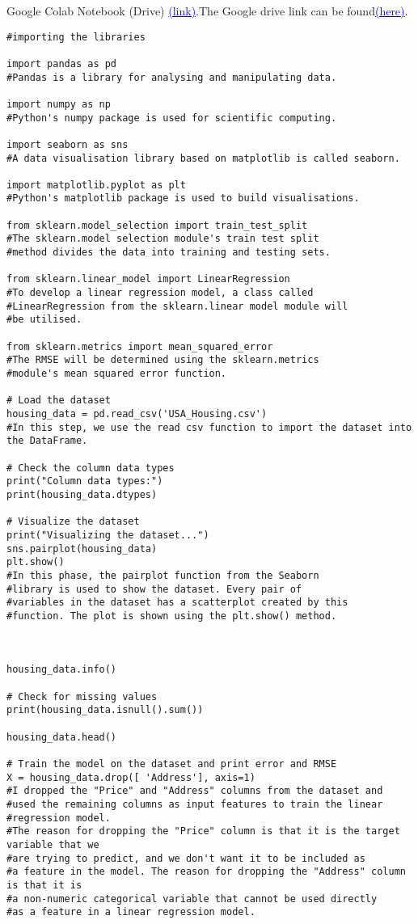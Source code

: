 \documentclass{article}
\begin{document}
Google Colab Notebook (Drive) \href{https://drive.google.com/drive/folders/1SFkQtmzvhyU-O0_g99m80oqBAWkEj22J?usp=sharing}{\textcolor{blue}{(link)}}.The Google drive link can be found\href{https://drive.google.com/drive/folders/1oUOGVvu0X8MpYs0S50cgQ-SZPvm9ikcR?usp=sharing}{\textcolor{blue}{(here)}}.
\begin{verbatim}
#importing the libraries

import pandas as pd
#Pandas is a library for analysing and manipulating data.

import numpy as np
#Python's numpy package is used for scientific computing.

import seaborn as sns
#A data visualisation library based on matplotlib is called seaborn.

import matplotlib.pyplot as plt
#Python's matplotlib package is used to build visualisations.

from sklearn.model_selection import train_test_split
#The sklearn.model selection module's train test split
#method divides the data into training and testing sets.

from sklearn.linear_model import LinearRegression
#To develop a linear regression model, a class called
#LinearRegression from the sklearn.linear model module will
#be utilised.

from sklearn.metrics import mean_squared_error
#The RMSE will be determined using the sklearn.metrics
#module's mean squared error function.

# Load the dataset
housing_data = pd.read_csv('USA_Housing.csv')
#In this step, we use the read csv function to import the dataset into the DataFrame.

# Check the column data types
print("Column data types:")
print(housing_data.dtypes)

# Visualize the dataset
print("Visualizing the dataset...")
sns.pairplot(housing_data)
plt.show()
#In this phase, the pairplot function from the Seaborn
#library is used to show the dataset. Every pair of
#variables in the dataset has a scatterplot created by this
#function. The plot is shown using the plt.show() method.



housing_data.info()

# Check for missing values
print(housing_data.isnull().sum())

housing_data.head()

# Train the model on the dataset and print error and RMSE 
X = housing_data.drop([ 'Address'], axis=1)
#I dropped the "Price" and "Address" columns from the dataset and
#used the remaining columns as input features to train the linear #regression model. 
#The reason for dropping the "Price" column is that it is the target variable that we
#are trying to predict, and we don't want it to be included as 
#a feature in the model. The reason for dropping the "Address" column is that it is
#a non-numeric categorical variable that cannot be used directly
#as a feature in a linear regression model.


\end{verbatim}
\end{document}

